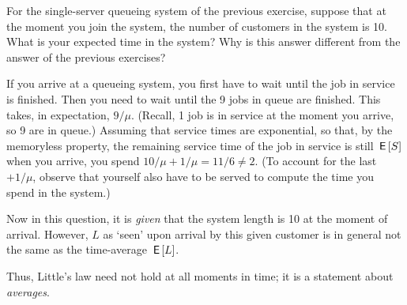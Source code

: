 \begin{exercise}
  For the  single-server queueing system of the previous exercise, 
 suppose that at the moment you join the system, the number of
    customers in the system is 10. What is your expected time in the
    system? 
 Why is this answer different from the answer of the previous exercises?
    \begin{solution}
If you arrive at a queueing system, you first have to wait until the job in service is finished.  Then you need to wait until the 9 jobs in queue are finished. This takes, in expectation, $9/\mu$. (Recall, 1 job is in service at the moment you arrive, so 9 are in queue.) Assuming that service times are exponential, so that, by the memoryless property, the remaining service time of the job in service is still $\,\mathsf{E}\left[S\right]$ when you arrive, you spend $10/\mu + 1/\mu = 11/6 \neq 2$. (To account for the last $+1/\mu$, observe that yourself also have to be served to compute the time you spend in the system.)


Now  in this question, it is \emph{given} that the system
    length is 10 at the moment of arrival. However, $L$ as `seen' upon arrival by this
    given customer  is in general  not the same as the  time-average $\,\mathsf{E}\left[L\right]$.

Thus, Little's law need  not hold at all moments in time; it is a statement about \emph{averages}.
    \end{solution}

\end{exercise}







